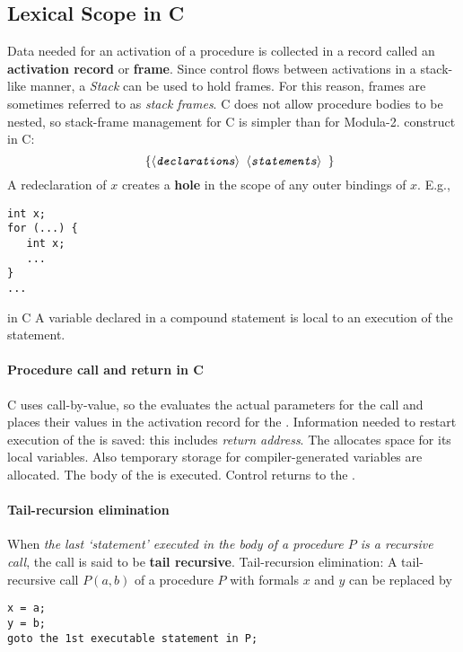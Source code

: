 \documentclass{article}
\begin{document}
\subsection{Lexical Scope in C}
\bit
\w Data needed for an activation of a procedure is collected in a
	record called an {\bf{}activation record} or {\bf{}frame}.
	\bit
	\w Since control flows between activations in a stack-like manner,
		a {\em{}Stack\/} can be used to hold frames.
	\w For this reason, frames are sometimes referred to as {\em{}stack
		frames\/}.
	\eit
\w C does not allow procedure bodies to be nested, so stack-frame 
	management for C is simpler than for Modula-2.
 construct in C:
	\[\mbox{\tt{}\ \ $\{$$\arc{declarations}\ \arc{statements}$ $\}$} \]
\w A redeclaration of $x$ creates a {\bf{}hole} in the scope of any
	outer bindings of $x$. E.g.,
\begin{verbatim}
int x;
for (...) {
   int x;
   ...
}
...
\end{verbatim}
 in C
	\bit
	\w A variable declared in a compound statement is local to an
		execution of the statement.
	\eit
\eit

\paragraph{Procedure call and return in C}
\bit
\w C uses call-by-value, so the  evaluates the actual
	parameters for the call and places their
	values in the  activation record for the .
\w Information needed to restart execution of the  is saved:
	this includes {\em{}return address\/}.
\w The  allocates space for its local variables.
	\bit
	\w Also temporary storage for compiler-generated variables
		are allocated.
	\eit
\w The body of the  is executed.
\w Control returns to the .
\eit

\paragraph{Tail-recursion elimination}
\bit
\w When {\em{}the last `statement' executed in the body of a procedure $P$
	is a recursive call\/}, the call is said to be {\bf{}tail 
	recursive}.
\w Tail-recursion elimination:
	\bit
	\w A tail-recursive call $P(a, b)$ of a procedure $P$ with 
		formals $x$ and $y$ can be replaced by
	\begin{verbatim}
x = a;
y = b;
goto the 1st executable statement in P;
	\end{verbatim}
	\eit
\eit
\end{document}
